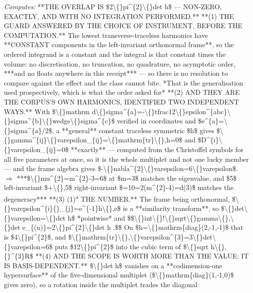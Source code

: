 \begin{description}
\emph{Computes:} **THE OVERLAP IS \$2\textbackslash\{\}pi\textasciicircum{}\{2\}\textbackslash\{\}det h\$ --- NON-ZERO, EXACTLY, AND WITH NO INTEGRATION PERFORMED.**  **(1) THE GUARD ANSWERED BY THE CHOICE OF INSTRUMENT, BEFORE THE COMPUTATION.** The lowest transverse-traceless harmonics have **CONSTANT components in the left-invariant orthonormal frame**, so the ordered integrand is a constant and the integral is that constant times the volume: no discretisation, no truncation, no quadrature, no asymptotic order, ***and no floats anywhere in this receipt*** --- so there is no resolution to compare against the effect and the class cannot bite. *That is the generalisation used prospectively, which is what the order asked for*  **(2) AND THEY ARE THE CORPUS'S OWN HARMONICS, IDENTIFIED TWO INDEPENDENT WAYS.** With \$\textbackslash\{\}mathrm d\textbackslash\{\}sigma\textasciicircum{}\{a\}=-\textbackslash\{\}tfrac12\textbackslash\{\}epsilon\textasciicircum{}\{abc\}\textbackslash\{\}sigma\textasciicircum{}\{b\}\textbackslash\{\}wedge\textbackslash\{\}sigma\textasciicircum{}\{c\}\$ verified in coordinates and \$e\textasciicircum{}\{a\}=\textbackslash\{\}sigma\textasciicircum{}\{a\}/2\$, a **general** constant traceless symmetric \$h\$ gives \$\textbackslash\{\}gamma\textasciicircum{}\{ij\}\textbackslash\{\}varepsilon\_\{ij\}=\textbackslash\{\}mathrm\{tr\}\textbackslash\{\},h=0\$ and \$D\textasciicircum{}\{i\}\textbackslash\{\}varepsilon\_\{ij\}=0\$ **exactly** --- computed from the Christoffel symbols for all five parameters at once, so it is the whole multiplet and not one lucky member --- and the frame algebra gives \$-\textbackslash\{\}nabla\textasciicircum{}\{2\}\textbackslash\{\}varepsilon=6\textbackslash\{\}varepsilon\$. \ensuremath{\Rightarrow} ***\$\textbackslash\{\}mu\textasciicircum{}\{2\}=m\textasciicircum{}\{2\}-3=6\$ at \$m=3\$ matches the eigenvalue, and \$5\$ left-invariant \$+\textbackslash\{\},5\$ right-invariant \$=10=2(m\textasciicircum{}\{2\}-4)=d(3)\$ matches the degeneracy***  **(3) (1)\textsuperscript{a} THE NUMBER.** The frame being orthonormal, \$\textbackslash\{\}varepsilon\textasciicircum{}\{i\}\{\}\_\{j\}=e\textasciicircum{}\{-1\}h\textbackslash\{\},e\$ is a **similarity transform**, so \$\textbackslash\{\}det\textbackslash\{\}varepsilon=\textbackslash\{\}det h\$ *pointwise* and \$\$\textbackslash\{\}int\textbackslash\{\}!\textbackslash\{\}sqrt\textbackslash\{\}gamma\textbackslash\{\},\textbackslash\{\}det e\_\{(n)\}=2\textbackslash\{\}pi\textasciicircum{}\{2\}\textbackslash\{\}det h .\$\$ On \$h=\textbackslash\{\}mathrm\{diag\}(2,-1,-1)\$ that is \$4\textbackslash\{\}pi\textasciicircum{}\{2\}\$, and \$\textbackslash\{\}mathrm\{tr\}\textbackslash\{\},\textbackslash\{\}varepsilon\textasciicircum{}\{3\}=3\textbackslash\{\}det\textbackslash\{\}varepsilon=6\$ puts \$12\textbackslash\{\}pi\textasciicircum{}\{2\}\$ into the cubic term of \$\textbackslash\{\}sqrt h\textbackslash\{\},\{\}\textasciicircum{}\{3\}R\$  **(4)  AND THE SCOPE IS WORTH MORE THAN THE VALUE: IT IS BASIS-DEPENDENT.** \$\textbackslash\{\}det h\$ vanishes on a **codimension-one hypersurface** of the five-dimensional multiplet (\$\textbackslash\{\}mathrm\{diag\}(1,-1,0)\$ gives zero), so a rotation inside the multiplet trades the diagonal 
\end{description}
